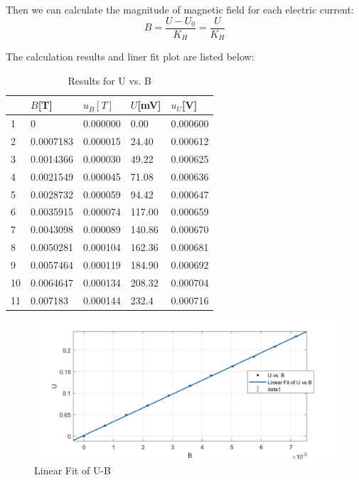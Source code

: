 \documentclass[12pt, a4paper]{article}
\begin{document}
Then we can calculate the magnitude of magnetic field for each electric current:
$$
B = \frac{U-U_0}{K_H} = \frac{U}{K_H}
$$

The calculation results and liner fit plot are listed below:
\begin{table}[H]
	\begin{center}
		\begin{tabular}{|l|l|l|l|l|}
			\hline
			   & $B${[}T{]} & $u_B[T]$ & $U${[}mV{]} & $u_U${[}V{]} \\ \hline
			1  & 0	        & 0.000000 & 0.00        & 0.000600     \\ \hline
			2  & 0.0007183  & 0.000015 & 24.40       & 0.000612     \\ \hline
			3  & 0.0014366  & 0.000030 & 49.22       & 0.000625     \\ \hline
			4  & 0.0021549  & 0.000045 & 71.08       & 0.000636     \\ \hline
			5  & 0.0028732  & 0.000059 & 94.42       & 0.000647     \\ \hline
			6  & 0.0035915  & 0.000074 & 117.00      & 0.000659     \\ \hline
			7  & 0.0043098  & 0.000089 & 140.86      & 0.000670     \\ \hline
			8  & 0.0050281  & 0.000104 & 162.36      & 0.000681     \\ \hline
			9  & 0.0057464  & 0.000119 & 184.90      & 0.000692     \\ \hline
			10 & 0.0064647  & 0.000134 & 208.32      & 0.000704     \\ \hline
			11 & 0.007183   & 0.000144 & 232.4       & 0.000716     \\ \hline
		\end{tabular}
		\caption{Results for U vs. B}
	\end{center}
\end{table}

\begin{figure}[H]
	\centering
	\includegraphics[scale = 0.3]{plot2.jpg}
	\caption{Linear Fit of U-B}
\end{figure}
\end{document}
